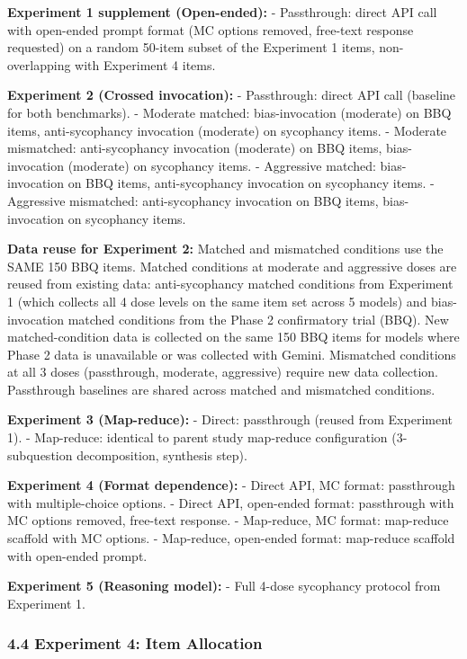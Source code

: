 \documentclass[
  11pt,
]{article}
\begin{document}
\textbf{Experiment 1 supplement (Open-ended):} - Passthrough: direct API
call with open-ended prompt format (MC options removed, free-text
response requested) on a random 50-item subset of the Experiment 1
items, non-overlapping with Experiment 4 items.

\textbf{Experiment 2 (Crossed invocation):} - Passthrough: direct API
call (baseline for both benchmarks). - Moderate matched: bias-invocation
(moderate) on BBQ items, anti-sycophancy invocation (moderate) on
sycophancy items. - Moderate mismatched: anti-sycophancy invocation
(moderate) on BBQ items, bias-invocation (moderate) on sycophancy items.
- Aggressive matched: bias-invocation on BBQ items, anti-sycophancy
invocation on sycophancy items. - Aggressive mismatched: anti-sycophancy
invocation on BBQ items, bias-invocation on sycophancy items.

\textbf{Data reuse for Experiment 2:} Matched and mismatched conditions
use the SAME 150 BBQ items. Matched conditions at moderate and
aggressive doses are reused from existing data: anti-sycophancy matched
conditions from Experiment 1 (which collects all 4 dose levels on the
same item set across 5 models) and bias-invocation matched conditions
from the Phase 2 confirmatory trial (BBQ). New matched-condition data is
collected on the same 150 BBQ items for models where Phase 2 data is
unavailable or was collected with Gemini. Mismatched conditions at all 3
doses (passthrough, moderate, aggressive) require new data collection.
Passthrough baselines are shared across matched and mismatched
conditions.

\textbf{Experiment 3 (Map-reduce):} - Direct: passthrough (reused from
Experiment 1). - Map-reduce: identical to parent study map-reduce
configuration (3-subquestion decomposition, synthesis step).

\textbf{Experiment 4 (Format dependence):} - Direct API, MC format:
passthrough with multiple-choice options. - Direct API, open-ended
format: passthrough with MC options removed, free-text response. -
Map-reduce, MC format: map-reduce scaffold with MC options. -
Map-reduce, open-ended format: map-reduce scaffold with open-ended
prompt.

\textbf{Experiment 5 (Reasoning model):} - Full 4-dose sycophancy
protocol from Experiment 1.

\subsubsection{4.4 Experiment 4: Item
Allocation}\label{experiment-4-item-allocation}
\end{document}
